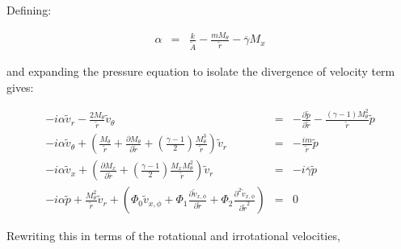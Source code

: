 \documentclass[12pt]{article}
\begin{document}
Defining:

\begin{eqnarray}
\alpha &=&
 \frac{k}{ \widetilde{A}}
- \frac{ m M_{\theta} }{\widetilde{r}}
- \overline{\gamma} M_x  
\nonumber
\end{eqnarray}

and expanding the pressure equation to isolate the divergence
of velocity term gives:

\begin{small}
\begin{eqnarray}
-i \alpha \widetilde{v}_r 
-\frac{2 M_{\theta}}{\widetilde{r}} \widetilde{v}_{\theta} 
&=&
-
\frac{\partial \widetilde{p} }{\partial \widetilde{r}} 
-
\frac{\left(\gamma - 1 \right) M_{\theta}^2}{\widetilde{r}} \widetilde{p}
\nonumber
\\
-i
\alpha
 \widetilde{v}_{\theta} 
+
\left(
\frac{M_{\theta} }{\widetilde{r}}
+
\frac{\partial M_{\theta} }{\partial \widetilde{r}}
+
\left(\frac{\gamma - 1}{2} \right) \frac{M_{\theta}^3}{\widetilde{r}}
\right) 
\widetilde{v}_r
&=&
-\frac{i m }{\widetilde{r} } \widetilde{p}
\nonumber
\\
-i
\alpha
\widetilde{v}_x 
+
\left(
\frac{\partial M_x }{\partial \widetilde{r}} 
+
\left(\frac{\gamma - 1}{2} \right) \frac{M_x M_{\theta}^2}{\widetilde{r}}
\right)
\widetilde{v}_r
&=&
-i \overline{\gamma} \widetilde{p}
\nonumber
\\
-i
\alpha
 \widetilde{p}
+
\frac{M_{\theta}^2}{\widetilde{r}}
\widetilde{v}_r
+ 
\left(
\Phi_0 
\widetilde{v}_{x,\phi}
+\Phi_1 
\frac{\partial
\widetilde{v}_{x,\phi}
}{\partial \widetilde{r}} 
+\Phi_2 
\frac{\partial^2
\widetilde{v}_{x,\phi}
}{\partial \widetilde{r}^2} 
\right)
&=&
0
\nonumber
\end{eqnarray}
\end{small}%

Rewriting this in terms of the rotational and irrotational velocities,
\end{document}
